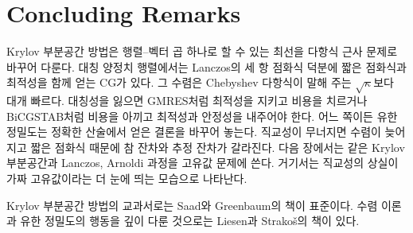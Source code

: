 \section{Concluding Remarks}

Krylov 부분공간 방법은 행렬--벡터 곱 하나로 할 수 있는 최선을 다항식 근사 문제로 바꾸어 다룬다. 대칭 양정치 행렬에서는 Lanczos의 세 항 점화식 덕분에 짧은 점화식과 최적성을 함께 얻는 CG가 있다. 그 수렴은 Chebyshev 다항식이 말해 주는 $\sqrt\kappa$보다 대개 빠르다. 대칭성을 잃으면 GMRES처럼 최적성을 지키고 비용을 치르거나 BiCGSTAB처럼 비용을 아끼고 최적성과 안정성을 내주어야 한다. 어느 쪽이든 유한 정밀도는 정확한 산술에서 얻은 결론을 바꾸어 놓는다. 직교성이 무너지면 수렴이 늦어지고 짧은 점화식 때문에 참 잔차와 추정 잔차가 갈라진다. 다음 장에서는 같은 Krylov 부분공간과 Lanczos, Arnoldi 과정을 고유값 문제에 쓴다. 거기서는 직교성의 상실이 가짜 고유값이라는 더 눈에 띄는 모습으로 나타난다.

Krylov 부분공간 방법의 교과서로는 Saad\cite{saad2003iterative}와 Greenbaum\cite{greenbaum1997iterative}의 책이 표준이다. 수렴 이론과 유한 정밀도의 행동을 깊이 다룬 것으로는 Liesen과 Strakoš의 책\cite{liesen2013krylov}이 있다.

\chapterreferences

